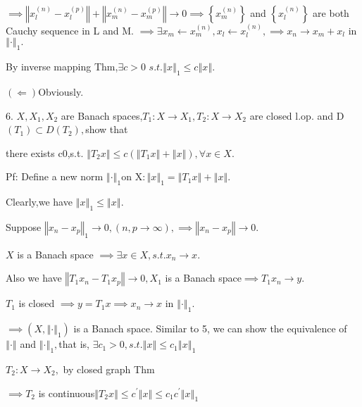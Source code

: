 \documentclass{article}
\begin{document}
\begin{CJK}{GBK}{song}
$\implies \left\Vert x_{l}^{\left( n\right) }-x_{l}^{\left( p\right)
}\right\Vert +\left\Vert x_{m}^{\left( n\right) }-x_{m}^{\left( p\right)
}\right\Vert \rightarrow 0\implies \left\{ x_{m}^{\left( n\right) }\right\} $
and $\left\{ x_{l}^{\left( n\right) }\right\} $ are both Cauchy sequence in
L and M. $\implies \exists x_{m}\leftarrow x_{m}^{\left( n\right)
},x_{l}\leftarrow x_{l}^{\left( n\right) },\implies x_{n}\rightarrow
x_{m}+x_{l}$ in $\left\Vert \cdot \right\Vert _{1}.$

\bigskip By inverse mapping Thm,$\exists c>0$ $s.t.\left\Vert x\right\Vert
_{1}\leq c\left\Vert x\right\Vert .$

$\left( \Longleftarrow \right) $Obviously.

6. $X,X_{1},X_{2}$ are Banach spaces,$T_{1}:X\rightarrow
X_{1},T_{2}:X\rightarrow X_{2}$ are closed l.op. and D$\left( T_{1}\right)
\subset D\left( T_{2}\right) ,$show that

there exists c\TEXTsymbol{>}0,s.t. $\left\Vert T_{2}x\right\Vert \leq
c\left( \left\Vert T_{1}x\right\Vert +\left\Vert x\right\Vert \right)
,\forall x\in X.$

Pf: Define a new norm $\left\Vert \cdot \right\Vert _{1}$on X$:\left\Vert
x\right\Vert _{1}=\left\Vert T_{1}x\right\Vert +\left\Vert x\right\Vert .$

Clearly,we have $\left\Vert x\right\Vert _{1}\leq \left\Vert x\right\Vert .$

Suppose $\left\Vert x_{n}-x_{p}\right\Vert _{1}\rightarrow 0,\left(
n,p\rightarrow \infty \right) ,\implies \left\Vert x_{n}-x_{p}\right\Vert
\rightarrow 0.$

$X$ is a Banach space $\implies \exists x\in X,s.t.x_{n}\rightarrow x.$

Also we have $\left\Vert T_{1}x_{n}-T_{1}x_{p}\right\Vert \rightarrow
0,X_{1} $ is a Banach space$\implies T_{1}x_{n}\rightarrow y.$

$T_{1}$ is closed $\implies y=T_{1}x\implies x_{n}\rightarrow x$ in $%
\left\Vert \cdot \right\Vert _{1}.$

$\implies \left( X,\left\Vert \cdot \right\Vert _{1}\right) $ is a Banach
space. Similar to 5, we can show the equivalence of $\left\Vert \cdot
\right\Vert $ and $\left\Vert \cdot \right\Vert _{1},$that is, $\exists
c_{1}>0,s.t.\left\Vert x\right\Vert \leq c_{1}\left\Vert x\right\Vert _{1}$

$T_{2}:X\rightarrow X_{2},$ by closed graph Thm

$\implies T_{2}$ is continuous$\left\Vert T_{2}x\right\Vert \leq c^{\prime
}\left\Vert x\right\Vert \leq c_{1}c^{\prime }\left\Vert x\right\Vert _{1}$


\end{CJK}
\end{document}
